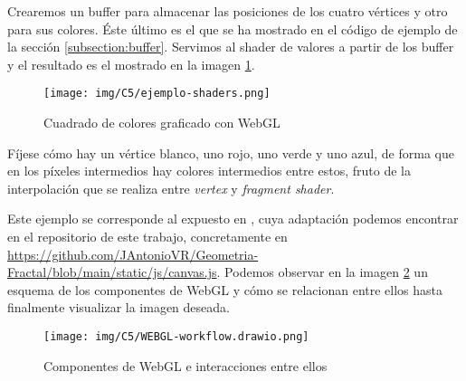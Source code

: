 Crearemos un buffer para almacenar las posiciones de los cuatro vértices y otro para sus colores. Éste último es el que se ha mostrado en el código de ejemplo de la sección \ref{subsection:buffer}. Servimos al shader de valores a partir de los buffer y el resultado es el mostrado en la imagen \ref{fig:ejemplo-wgl}.

\begin{figure} [ht]
    \centering
    \texttt{[image: img/C5/ejemplo-shaders.png]}
    \caption{Cuadrado de colores graficado con WebGL}
    \label{fig:ejemplo-wgl}
\end{figure}

Fíjese cómo hay un vértice blanco, uno rojo, uno verde y uno azul, de forma que en los píxeles intermedios hay colores intermedios entre estos, fruto de la interpolación que se realiza entre \textit{vertex} y \textit{fragment shader}.

Este ejemplo se corresponde al expuesto en \cite{MDN-1}, cuya adaptación podemos encontrar en el repositorio de este trabajo, concretamente en \url{https://github.com/JAntonioVR/Geometria-Fractal/blob/main/static/js/canvas.js}. Podemos observar en la imagen \ref{fig:componentes-wgl} un esquema de los componentes de WebGL y cómo se relacionan entre ellos hasta finalmente visualizar la imagen deseada.  %

\newpage



\begin{figure} [ht]
    \centering
    \texttt{[image: img/C5/WEBGL-workflow.drawio.png]}
    \caption{Componentes de WebGL e interacciones entre ellos}
    \label{fig:componentes-wgl}
\end{figure}


